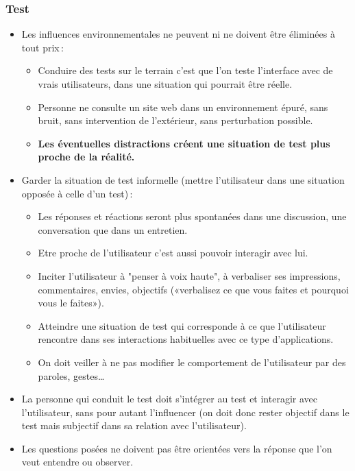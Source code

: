 		\begin{frame}[allowframebreaks]
		\frametitle{Test \citep{ergolab2014a}}
					\begin {itemize}
				      \item Les influences environnementales ne peuvent ni ne doivent être éliminées à tout prix\,:
						\begin {itemize}
						\item Conduire des tests sur le terrain c'est que l'on teste l'interface avec de vrais utilisateurs, dans une situation qui pourrait être réelle. 
						\item Personne ne consulte un site web dans un environnement épuré, sans bruit, sans intervention de l'extérieur, sans perturbation possible.
						\item \textbf{Les éventuelles distractions créent une situation de test plus proche de la réalité.}
						\end{itemize}

					\framebreak
					\item Garder la situation de test informelle (mettre l'utilisateur dans une situation opposée à celle d'un test)\,: 
						\begin {itemize}
						\item Les réponses et réactions seront plus spontanées dans une discussion, une conversation que dans un entretien. 
						\item Etre proche de l'utilisateur c'est aussi pouvoir interagir avec lui. 
						\item Inciter l'utilisateur à "penser à voix haute", à verbaliser ses impressions, commentaires, envies, objectifs («verbalisez ce que vous faites et pourquoi vous le faites»). 
						\item Atteindre une situation de test qui corresponde à ce que l'utilisateur rencontre dans ses interactions habituelles avec ce type d'applications. 
						\item On doit veiller à ne pas modifier le comportement de l'utilisateur par des paroles, gestes…
						\end{itemize}
					\item La personne qui conduit le test doit s'intégrer au test et interagir avec l'utilisateur, sans pour autant l'influencer (on doit donc rester objectif dans le test mais subjectif dans sa relation avec l'utilisateur).
					\item Les questions posées ne doivent pas être orientées vers la réponse que l'on veut entendre ou observer. 
					

\end{itemize}
\end{frame}
